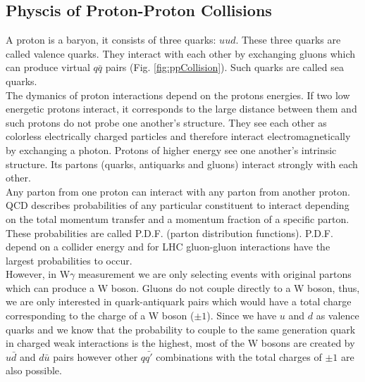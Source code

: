 \subsection{Physcis of Proton-Proton Collisions}



A proton is a baryon, it consists of three quarks: $uud$. These three quarks are called valence quarks. They interact with each other by exchanging gluons which can produce virtual $q\bar{q}$ pairs (Fig. \ref{fig:ppCollision}). Such quarks are called sea quarks. \\


The dymanics of proton interactions depend on the protons energies. If two low energetic protons interact, it corresponds to the large distance between them and such protons do not probe one another's structure. They see each other as colorless electrically charged particles and therefore interact electromagnetically by exchanging a photon. Protons of higher energy see one another's intrinsic structure. Its partons (quarks, antiquarks and gluons) interact strongly with each other.\\

Any parton from one proton can interact with any parton from another proton. QCD describes probabilities of any particular constituent to interact depending on the total momentum transfer and a momentum fraction of a specific parton. These probabilities are called P.D.F. (parton distribution functions). P.D.F. depend on a collider energy and for LHC gluon-gluon interactions have the largest probabilities to occur.\\

However, in W$\gamma$ measurement we are only selecting events with original partons which can produce a W boson. Gluons do not couple directly to a W boson, thus, we are only interested in quark-antiquark pairs which would have a total charge corresponding to the charge of a W boson ($\pm 1$). Since we have $u$ and $d$ as valence quarks and we know that the probability to couple to the same generation quark in charged weak interactions is the highest, most of the W bosons are created by $u\bar{d}$ and $d\bar{u}$ pairs however other $q\bar{q'}$ combinations with the total charges of $\pm 1$ are also possible.\\

